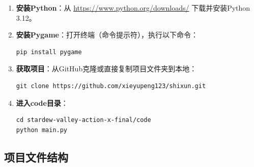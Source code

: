 \documentclass[12pt,a4paper]{ctexart}
\begin{document}
\begin{enumerate}[label=\textbf{步骤\arabic*：}]
    \item \textbf{安装Python}：从 \url{https://www.python.org/downloads/} 下载并安装Python 3.12。

    \item \textbf{安装Pygame}：打开终端（命令提示符），执行以下命令：
    \begin{lstlisting}[caption={安装Pygame}]
pip install pygame
    \end{lstlisting}

    \item \textbf{获取项目}：从GitHub克隆或直接复制项目文件夹到本地：
    \begin{lstlisting}[caption={克隆项目}]
git clone https://github.com/xieyupeng123/shixun.git
    \end{lstlisting}

    \item \textbf{进入code目录}：
    \begin{lstlisting}[caption={启动游戏}]
cd stardew-valley-action-x-final/code
python main.py
    \end{lstlisting}
\end{enumerate}

\subsection{项目文件结构}
\end{document}
